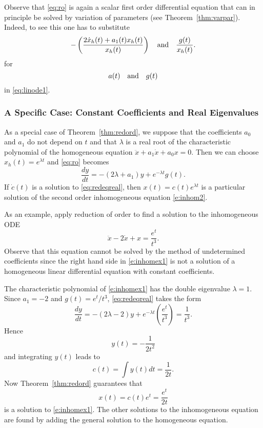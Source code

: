 \documentclass{ximera}
\begin{document}
Observe that \eqref{eq:ro} is again a scalar first order differential
equation that can in principle be solved by variation of 
parameters (see Theorem~\ref{thm:varpar}).
Indeed, to see this one has to substitute
\[
 -\left(\frac{2\dot x_h(t)+a_1(t) x_h(t)}{x_h(t)}\right)
\quad\mbox{and}\quad \frac{g(t)}{x_h(t)}.
\]
for
\[
a(t) \quad\mbox{and}\quad g(t)
\]
in \eqref{eq:linode1}.




\subsubsection*{A Specific Case: Constant Coefficients and Real Eigenvalues}

As a special case of Theorem~\ref{thm:redord}, we suppose that 
the coefficients $a_0$ and $a_1$ do not depend on $t$ and that $\lambda$ is a
real root of the characteristic 
polynomial 
of the homogeneous equation
$\ddot{x} + a_1\dot{x} + a_0x = 0$.  Then we can choose $x_h(t)=e^{\lambda t}$
and \eqref{eq:ro} becomes
\begin{equation}  \label{eq:redeqreal}
\frac{dy}{dt} = -(2\lambda +a_1) y + e^{-\lambda t}g(t).
\end{equation}
If $\dot c(t)$ is a solution to \eqref{eq:redeqreal}, then
$x(t)=c(t) e^{\lambda t}$ is a particular 
solution 
of the second order inhomogeneous equation \eqref{e:inhom2}.

As an example, apply reduction of order to find a solution to the inhomogeneous
ODE
\begin{equation}  \label{e:inhomex1}
\ddot{x} - 2\dot{x} + x = \frac{e^t}{t^3}.
\end{equation}
Observe that this equation cannot be solved by the method of undetermined
coefficients since the right hand 
side in \eqref{e:inhomex1} is not a
solution of a homogeneous linear differential equation with constant 
coefficients.

The characteristic polynomial of \eqref{e:inhomex1} has the double eigenvalue 
$\lambda = 1$.  Since $a_1=-2$ and $g(t) = e^t/t^3$, \eqref{eq:redeqreal} takes 
the form
\[
\frac{dy}{dt} = -(2\lambda -2) y + e^{-\lambda t}\left( \frac{e^t}{t^3}\right)
= \frac{1}{t^3}.
\]
Hence 
\[
y(t) = -\frac{1}{2t^2}
\]
and integrating $y(t)$ leads to
\[
c(t) = \int y(t) dt = \frac{1}{2t}.
\]
Now Theorem~\ref{thm:redord} guarantees that
\[
x(t) = c(t)e^t = \frac{e^t}{2t}
\]
is a solution to \eqref{e:inhomex1}.  The other solutions to the inhomogeneous
equation are found by adding the general solution 
to the homogeneous equation.
\end{document}
